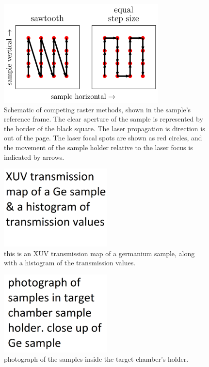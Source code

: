\begin{figure}
	\centering
	\includegraphics[width=0.75\textwidth]{figures/chap3/Rastering_Methods.png}
	\caption{Schematic of competing raster methods, shown in the sample's reference frame. The clear aperture of the sample is represented by the border of the black square. The laser propagation is direction is out of the page. The laser focal spots are shown as red circles, and the movement of the sample holder relative to the laser focus is indicated by arrows.}
	\label{fig:Rastering_Methods}
\end{figure}

\begin{figure}
	\centering
	\includegraphics[width=0.5\textwidth]{figures/chap3/Ge_sample_map.png}
	\caption{this is an XUV transmission map of a germanium sample, along with a histogram of the transmission values.}
	\label{fig:Ge_sample_map}
\end{figure}

\begin{figure}
	\centering
	\includegraphics[width=0.5\textwidth]{figures/chap3/Samples_in_holder.png}
	\caption{photograph of the samples inside the target chamber's holder.}
	\label{fig:Samples_in_holder}
\end{figure}

